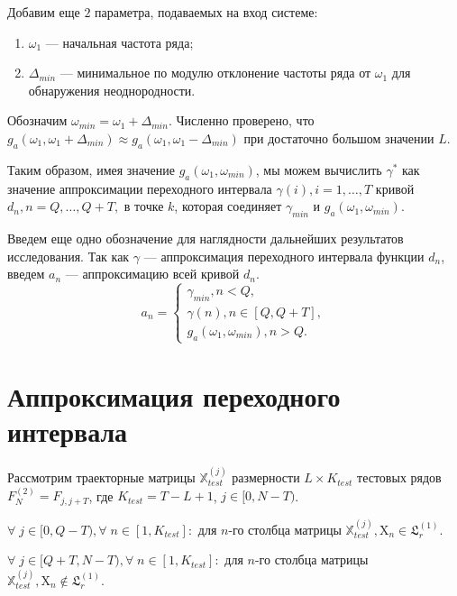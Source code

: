 \documentclass[specialist, substylefile = spbu.rtx,
			   subf, href, 12pt]{disser}
\begin{document}
Добавим еще $ 2 $ параметра, подаваемых на вход системе:
\begin{enumerate}
	\item $ \omega_1 $ --- начальная частота ряда;
	\item $ \Delta_{min} $ --- минимальное по модулю отклонение частоты ряда от $ \omega_1 $ для обнаружения неоднородности.
\end{enumerate}

Обозначим $ \omega_{min} = \omega_1 + \Delta_{min}$. Численно проверено, что $ g_a(\omega_1, \omega_1 + \Delta_{min}) \approx g_a(\omega_1, \omega_1 - \Delta_{min}) $ при достаточно большом значении $ L $.

Таким образом, имея значение $ g_a(\omega_1, \omega_{min}) $, мы можем вычислить $ \gamma^* $ как значение аппроксимации переходного интервала $ \gamma(i), i=1, \dots, T $ кривой $ d_n, n=Q, \dots, Q+T, $ в точке $ k $, которая соединяет $ \gamma_{min} $ и $ g_a(\omega_1, \omega_{min}) $. 

Введем еще одно обозначение для наглядности дальнейших результатов исследования. Так как $ \gamma $ --- аппроксимация переходного интервала функции $ d_n $, введем $ a_n $ --- аппроксимацию всей кривой $ d_n $.
\begin{equation}\label{eq:a_n}
	a_n = 
	\begin{cases}
		\gamma_{min}, n < Q,\\
		\gamma(n), n \in [Q, Q+T],\\
		g_a(\omega_1, \omega_{min}), n > Q.
	\end{cases}
\end{equation}


\section{Аппроксимация переходного интервала}\label{ch:approx_d_n}
Рассмотрим траекторные матрицы $ \mathbb{X}_{test}^{(j)} $ размерности $ L \times K_{test} $ тестовых рядов $ F_N^{(2)} = F_{j, j+T} $, где $ K_{test} = T - L + 1 $, $ j \in [0, N-T) $. 

$ \forall \; j \in [0, Q - T), \forall \; n \in [1, K_{test}]: $ для $ n $-го столбца матрицы $ \mathbb{X}_{test}^{(j)},  \mathrm{X}_n \in \mathfrak{L}_r^{(1)} $. 

$ \forall \; j \in [Q+T, N-T), \forall \; n \in [1, K_{test}]: $ для $ n $-го столбца матрицы $ \mathbb{X}_{test}^{(j)},  \mathrm{X}_n \notin \mathfrak{L}_r^{(1)} $. 

\bigskip
\end{document}

